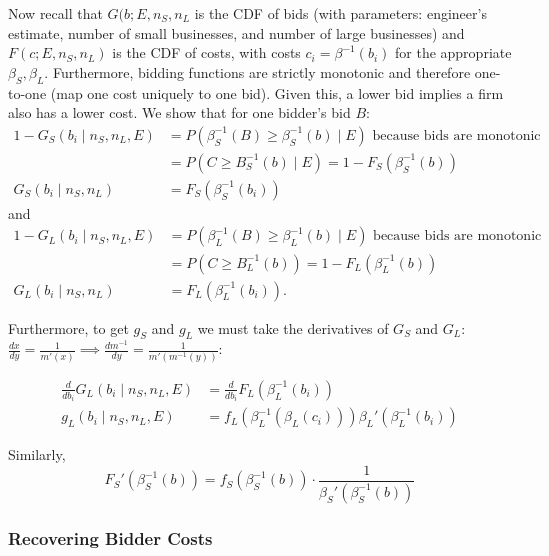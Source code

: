 Now recall that \(G(b; E, n_S, n_L\) is the CDF of bids (with parameters:
engineer's estimate, number of small businesses, and number of large businesses) and
\(F(c; E, n_S, n_L)\) is the CDF of costs, with costs \(c_i = \beta^{-1}(b_i)\) for the appropriate
\(\beta_S, \beta_L\).
Furthermore, bidding functions are strictly monotonic and therefore
one-to-one (map one cost uniquely to one bid).
Given this, a lower bid implies a firm also has a lower cost. We show that for one bidder's bid \(B\):
\[ \begin{aligned}
  1 - G_S(b_i \mid n_S, n_L, E) &= P(\beta_S^{-1}(B) \ge \beta_{S}^{-1}(b) \mid E) \text{ because bids are monotonic} \\
    &= P(C \ge B_{S}^{-1}(b) \mid E) = 1 - F_{S} (\beta_{S}^{-1}(b)) \\
  G_S(b_i \mid n_S, n_L) &= F_S(\beta_S^{-1}(b_i))
\end{aligned} \]
and 
\[ \begin{aligned}
  1 - G_L(b_i \mid n_S, n_L, E) &= P(\beta_L^{-1}(B) \ge \beta_{L}^{-1}(b) \mid E) \text{ because bids are monotonic} \\
    &= P(C \ge B_{L}^{-1}(b)) = 1 - F_{L} (\beta_{L}^{-1}(b)) \\
  G_L(b_i \mid n_S, n_L) &= F_L(\beta_L^{-1}(b_i)).
\end{aligned} \]

Furthermore, to get $g_S$ and $g_L$ we must take the derivatives of $G_S$ and $G_L$:
\(\frac{dx}{dy} = \frac{1}{m'(x)} \implies \frac{dm^{-1}}{dy} = \frac{1}{m'(m^{-1}(y))}\):

\[ \begin{aligned}
  \frac{d}{db_i} G_L(b_i \mid n_S, n_L, E) &= \frac{d}{db_i} F_L(\beta_L^{-1}(b_i)) \\
  g_L(b_i \mid n_S, n_L, E) &= f_L(\beta_L^{-1}(\beta_L(c_i))) \beta_L'(\beta_L^{-1}(b_i))
\end{aligned} \]

Similarly, 
\[
  F_{S}'(\beta_{S}^{-1}(b)) = f_{S}(\beta_S^{-1}(b)) \cdot \frac{1}{\beta_S'(\beta_S^{-1}(b))}
\]

\subsubsection{Recovering Bidder Costs}

